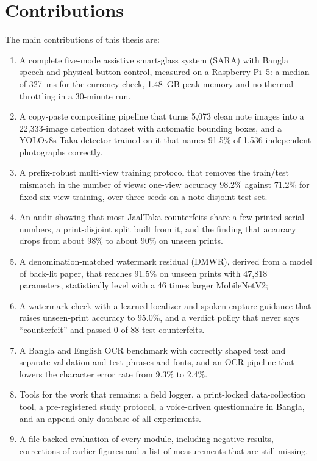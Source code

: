 \section{Contributions}
\label{sec:contributions}
The main contributions of this thesis are:
\begin{enumerate}[noitemsep]
    \item A complete five-mode assistive smart-glass system (SARA) with Bangla speech and physical button control, measured on a Raspberry Pi~5: a median of 327~ms for the currency check, 1.48~GB peak memory and no thermal throttling in a 30-minute run.
    \item A copy-paste compositing pipeline that turns 5,073 clean note images into a 22,333-image detection dataset with automatic bounding boxes, and a YOLOv8s Taka detector trained on it that names 91.5\% of 1,536 independent photographs correctly.
    \item A prefix-robust multi-view training protocol that removes the train/test mismatch in the number of views: one-view accuracy 98.2\% against 71.2\% for fixed six-view training, over three seeds on a note-disjoint test set.
    \item An audit showing that most JaalTaka counterfeits share a few printed serial numbers, a print-disjoint split built from it, and the finding that accuracy drops from about 98\% to about 90\% on unseen prints.
    \item A denomination-matched watermark residual (DMWR), derived from a model of back-lit paper, that reaches 91.5\% on unseen prints with 47,818 parameters, statistically level with a 46 times larger MobileNetV2;
    \item A watermark check with a learned localizer and spoken capture guidance that raises unseen-print accuracy to 95.0\%, and a verdict policy that never says ``counterfeit'' and passed 0 of 88 test counterfeits.
    \item A Bangla and English OCR benchmark with correctly shaped text and separate validation and test phrases and fonts, and an OCR pipeline that lowers the character error rate from 9.3\% to 2.4\%.
    \item Tools for the work that remains: a field logger, a print-locked data-collection tool, a pre-registered study protocol, a voice-driven questionnaire in Bangla, and an append-only database of all experiments.
    \item A file-backed evaluation of every module, including negative results, corrections of earlier figures and a list of measurements that are still missing.
\end{enumerate}


